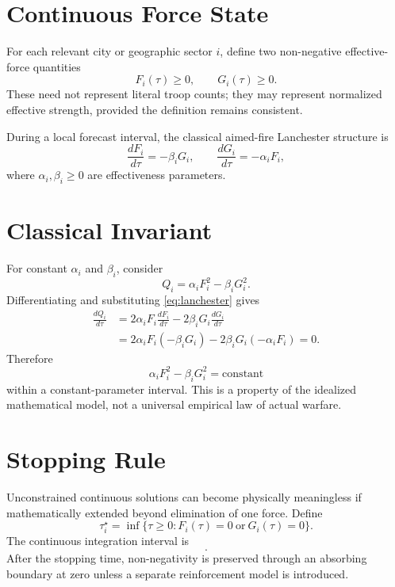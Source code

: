 \documentclass[11pt,letterpaper]{article}
\begin{document}
\section{Continuous Force State}
For each relevant city or geographic sector $i$, define two non-negative effective-force quantities
\begin{equation}
F_i(\tau)\geq0,
\qquad
G_i(\tau)\geq0.
\end{equation}
These need not represent literal troop counts; they may represent normalized effective strength, provided the definition remains consistent.

During a local forecast interval, the classical aimed-fire Lanchester structure is
\begin{equation}
\frac{dF_i}{d\tau}=-\beta_iG_i,
\qquad
\frac{dG_i}{d\tau}=-\alpha_iF_i,
\label{eq:lanchester}
\end{equation}
where $\alpha_i,\beta_i\geq0$ are effectiveness parameters.

\section{Classical Invariant}
For constant $\alpha_i$ and $\beta_i$, consider
\begin{equation}
Q_i=\alpha_iF_i^2-\beta_iG_i^2.
\end{equation}
Differentiating and substituting \cref{eq:lanchester} gives
\begin{align}
\frac{dQ_i}{d\tau}
&=2\alpha_iF_i\frac{dF_i}{d\tau}-2\beta_iG_i\frac{dG_i}{d\tau}\\
&=2\alpha_iF_i(-\beta_iG_i)-2\beta_iG_i(-\alpha_iF_i)=0.
\end{align}
Therefore
\begin{equation}
\alpha_iF_i^2-\beta_iG_i^2=\text{constant}
\label{eq:invariant}
\end{equation}
within a constant-parameter interval. This is a property of the idealized mathematical model, not a universal empirical law of actual warfare.

\section{Stopping Rule}
Unconstrained continuous solutions can become physically meaningless if mathematically extended beyond elimination of one force. Define
\begin{equation}
\tau_i^{\star}=\inf\{\tau\geq0:F_i(\tau)=0\ \text{or}\ G_i(\tau)=0\}.
\end{equation}
The continuous integration interval is
\begin{equation}
[0,\min(\Delta,\tau_i^{\star})].
\end{equation}
After the stopping time, non-negativity is preserved through an absorbing boundary at zero unless a separate reinforcement model is introduced.
\end{document}
